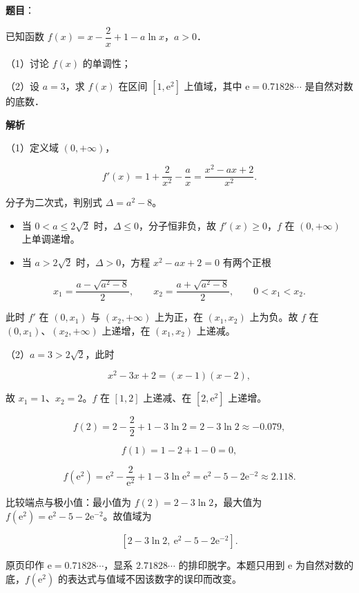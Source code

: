 \begin{answer}

\textbf{题目}：

已知函数 $f(x)=x-\dfrac2x+1-a\ln x$，$a>0$．

（1）讨论 $f(x)$ 的单调性；

（2）设 $a=3$，求 $f(x)$ 在区间 $[1,\mathrm e^2]$ 上值域，其中 $\mathrm e=0.71828\cdots$ 是自然对数的底数．

\textbf{解析}

（1）定义域 $(0,+\infty)$，

\nopagebreak[4]
\[f'(x)=1+\frac{2}{x^2}-\frac ax=\frac{x^2-ax+2}{x^2}.\]

分子为二次式，判别式 $\Delta=a^2-8$。

\begin{itemize}
\item 当 $0<a\leqslant2\sqrt2$ 时，$\Delta\leqslant0$，分子恒非负，故 $f'(x)\geqslant0$，$f$ 在 $(0,+\infty)$ 上单调递增。
\item 当 $a>2\sqrt2$ 时，$\Delta>0$，方程 $x^2-ax+2=0$ 有两个正根
\end{itemize}

\nopagebreak[4]
\[x_1=\frac{a-\sqrt{a^2-8}}{2},\qquad x_2=\frac{a+\sqrt{a^2-8}}{2},\qquad 0<x_1<x_2 .\]

此时 $f'$ 在 $(0,x_1)$ 与 $(x_2,+\infty)$ 上为正，在 $(x_1,x_2)$ 上为负。故 $f$ 在 $(0,x_1)$、$(x_2,+\infty)$ 上递增，在 $(x_1,x_2)$ 上递减。

（2）$a=3>2\sqrt2$，此时

\nopagebreak[4]
\[x^2-3x+2=(x-1)(x-2),\]

故 $x_1=1$、$x_2=2$。$f$ 在 $[1,2]$ 上递减、在 $[2,\mathrm e^2]$ 上递增。

\nopagebreak[4]
\[f(2)=2-\frac22+1-3\ln2=2-3\ln2\approx-0.079,\]

\nopagebreak[4]
\[f(1)=1-2+1-0=0,\]

\nopagebreak[4]
\[f(\mathrm e^2)=\mathrm e^2-\frac{2}{\mathrm e^2}+1-3\ln\mathrm e^2=\mathrm e^2-5-2\mathrm e^{-2}\approx2.118 .\]

比较端点与极小值：最小值为 $f(2)=2-3\ln2$，最大值为 $f(\mathrm e^2)=\mathrm e^2-5-2\mathrm e^{-2}$。故值域为

\nopagebreak[4]
\[\left[2-3\ln2,\ \mathrm e^2-5-2\mathrm e^{-2}\right].\]

\begin{gktip}
原页印作 $\mathrm e=0.71828\cdots$，显系 $2.71828\cdots$ 的排印脱字。本题只用到 $\mathrm e$ 为自然对数的底，$f(\mathrm e^2)$ 的表达式与值域不因该数字的误印而改变。
\end{gktip}


\end{answer}